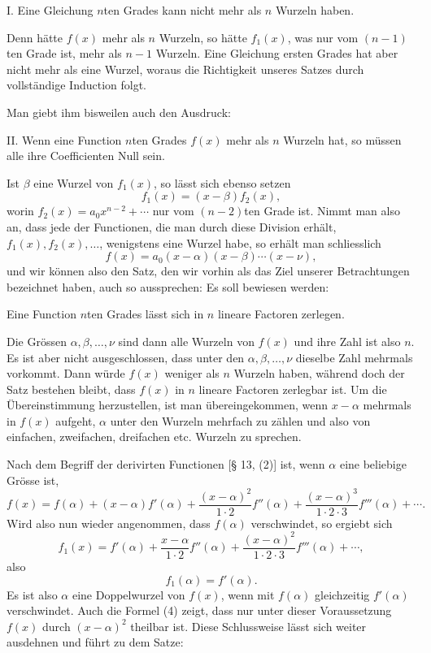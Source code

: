 \documentclass[11pt]{article}
\begin{document}
\medskip
\noindent I. Eine Gleichung $n$ten Grades kann nicht mehr als $n$ Wurzeln haben.
\medskip

Denn hätte $f(x)$ mehr als $n$ Wurzeln, so hätte $f_1(x)$, was nur vom $(n-1)$ten Grade ist, mehr als $n-1$ Wurzeln. Eine Gleichung ersten Grades hat aber nicht mehr als eine Wurzel, woraus die Richtigkeit unseres Satzes durch vollständige Induction folgt.

Man giebt ihm bisweilen auch den Ausdruck:

\medskip
\noindent II. Wenn eine Function $n$ten Grades $f(x)$ mehr als $n$ Wurzeln hat, so müssen alle ihre Coefficienten Null sein.
\medskip

Ist $\beta$ eine Wurzel von $f_1(x)$, so lässt sich ebenso setzen
\[
 f_1(x)=(x-\beta)f_2(x),
\]
worin $f_2(x)=a_0x^{n-2}+\cdots$ nur vom $(n-2)$ten Grade ist. Nimmt man also an, dass jede der Functionen, die man durch diese Division erhält, $f_1(x), f_2(x),\ldots$, wenigstens eine Wurzel habe, so erhält man schliesslich
\begin{equation}
 f(x)=a_0(x-\alpha)(x-\beta)\cdots(x-\nu),
\tag{3}
\end{equation}
und wir können also den Satz, den wir vorhin als das Ziel unserer Betrachtungen bezeichnet haben, auch so aussprechen: Es soll bewiesen werden:

\medskip
\noindent Eine Function $n$ten Grades lässt sich in $n$ lineare Factoren zerlegen.
\medskip

Die Grössen $\alpha,\beta,\ldots,\nu$ sind dann alle Wurzeln von $f(x)$ und ihre Zahl ist also $n$. Es ist aber nicht ausgeschlossen, dass unter den $\alpha,\beta,\ldots,\nu$ dieselbe Zahl mehrmals vorkommt. Dann würde $f(x)$ weniger als $n$ Wurzeln haben, während doch der Satz bestehen bleibt, dass $f(x)$ in $n$ lineare Factoren zerlegbar ist. Um die Übereinstimmung herzustellen, ist man übereingekommen, wenn $x-\alpha$ mehrmals in $f(x)$ aufgeht, $\alpha$ unter den Wurzeln mehrfach zu zählen und also von einfachen, zweifachen, dreifachen etc. Wurzeln zu sprechen.

Nach dem Begriff der derivirten Functionen [§ 13, (2)] ist, wenn $\alpha$ eine beliebige Grösse ist,
\begin{equation}
 f(x)=f(\alpha)+(x-\alpha)f'(\alpha)+\frac{(x-\alpha)^2}{1\cdot2}f''(\alpha)
 +\frac{(x-\alpha)^3}{1\cdot2\cdot3}f'''(\alpha)+\cdots .
\tag{4}
\end{equation}
Wird also nun wieder angenommen, dass $f(\alpha)$ verschwindet, so ergiebt sich
\[
 f_1(x)=f'(\alpha)+\frac{x-\alpha}{1\cdot2}f''(\alpha)+\frac{(x-\alpha)^2}{1\cdot2\cdot3}f'''(\alpha)+\cdots,
\]
also
\[
 f_1(\alpha)=f'(\alpha).
\]
Es ist also $\alpha$ eine Doppelwurzel von $f(x)$, wenn mit $f(\alpha)$ gleichzeitig $f'(\alpha)$ verschwindet. Auch die Formel (4) zeigt, dass nur unter dieser Voraussetzung $f(x)$ durch $(x-\alpha)^2$ theilbar ist. Diese Schlussweise lässt sich weiter ausdehnen und führt zu dem Satze:
\end{document}
